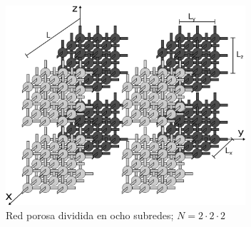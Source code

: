 \begin{figure}[hbtp]
\centering
\includegraphics[width=3.5in]{img/distribucion.pdf}
\caption{Red porosa dividida en ocho subredes; $N=2\cdot2\cdot2$}
\label{fig:distribution}
\end{figure}

